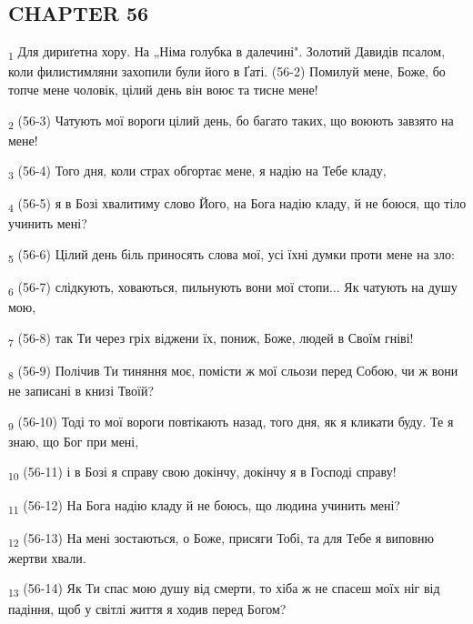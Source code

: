 \subsection{CHAPTER 56}
\begin{tcolorbox}
\textsubscript{1} Для дириґетна хору. На „Німа голубка в далечині". Золотий Давидів псалом, коли филистимляни захопили були його в Ґаті. (56-2) Помилуй мене, Боже, бо топче мене чоловік, цілий день він воює та тисне мене!
\end{tcolorbox}
\begin{tcolorbox}
\textsubscript{2} (56-3) Чатують мої вороги цілий день, бо багато таких, що воюють завзято на мене!
\end{tcolorbox}
\begin{tcolorbox}
\textsubscript{3} (56-4) Того дня, коли страх обгортає мене, я надію на Тебе кладу,
\end{tcolorbox}
\begin{tcolorbox}
\textsubscript{4} (56-5) я в Бозі хвалитиму слово Його, на Бога надію кладу, й не боюся, що тіло учинить мені?
\end{tcolorbox}
\begin{tcolorbox}
\textsubscript{5} (56-6) Цілий день біль приносять слова мої, усі їхні думки проти мене на зло:
\end{tcolorbox}
\begin{tcolorbox}
\textsubscript{6} (56-7) слідкують, ховаються, пильнують вони мої стопи... Як чатують на душу мою,
\end{tcolorbox}
\begin{tcolorbox}
\textsubscript{7} (56-8) так Ти через гріх віджени їх, пониж, Боже, людей в Своїм гніві!
\end{tcolorbox}
\begin{tcolorbox}
\textsubscript{8} (56-9) Полічив Ти тиняння моє, помісти ж мої сльози перед Собою, чи ж вони не записані в книзі Твоїй?
\end{tcolorbox}
\begin{tcolorbox}
\textsubscript{9} (56-10) Тоді то мої вороги повтікають назад, того дня, як я кликати буду. Те я знаю, що Бог при мені,
\end{tcolorbox}
\begin{tcolorbox}
\textsubscript{10} (56-11) і в Бозі я справу свою докінчу, докінчу я в Господі справу!
\end{tcolorbox}
\begin{tcolorbox}
\textsubscript{11} (56-12) На Бога надію кладу й не боюсь, що людина учинить мені?
\end{tcolorbox}
\begin{tcolorbox}
\textsubscript{12} (56-13) На мені зостаються, о Боже, присяги Тобі, та для Тебе я виповню жертви хвали.
\end{tcolorbox}
\begin{tcolorbox}
\textsubscript{13} (56-14) Як Ти спас мою душу від смерти, то хіба ж не спасеш моїх ніг від падіння, щоб у світлі життя я ходив перед Богом?
\end{tcolorbox}
